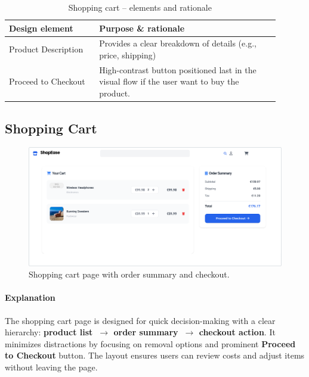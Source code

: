 \documentclass[12pt]{article}
\begin{document}
	\begin{table}[H]
		\centering
		\caption{Shopping cart – elements and rationale}
		\begin{tabular}{p{0.30\linewidth} p{0.60\linewidth}}
			\hline
			\textbf{Design element} & Purpose \& rationale \\
			\hline
			Product Description & Provides a clear breakdown of details (e.g., price, shipping)  \\
			Proceed to Checkout & High-contrast button positioned last in the visual flow if the user want to buy the product. \\
			\hline
		\end{tabular}
	\end{table}


	\subsection{Shopping Cart}\label{subsec:shopping-cart}

	\begin{figure}[H]
		\centering
		\includegraphics[width=\linewidth]{pictures/main/ShoppingCart_Figma}%
		\caption{Shopping cart page with order summary and checkout.}
		\label{fig:ui-cart}
	\end{figure}

	\paragraph{Explanation}%
	The shopping cart page is designed for quick decision-making with a clear hierarchy:
	\textbf{product list~$\rightarrow$ order summary~$\rightarrow$ checkout action}. It minimizes distractions
	by focusing on removal options and prominent \textbf{Proceed to Checkout} button.
	The layout ensures users can review costs and adjust items without leaving the page.
\end{document}
